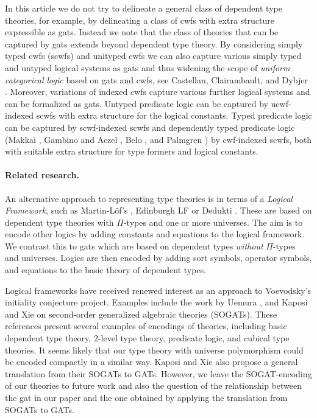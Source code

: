 \documentclass{easychair}
\def\Sigmaext{{\Sigma^\mathrm{ext}}}
\def\Sigmaint{{\Sigma^\mathrm{up}}}
\def\TText{{\mathbf{TT}^\mathrm{ext}}}
\def\TTint{{\mathbf{TT}^\mathrm{up}}}
\begin{document}
In this article we do not try to delineate a general class of dependent type theories, for example, by delineating a class of cwfs with extra structure expressible as gats. Instead we note that the class of theories that can be captured by gats extends beyond dependent type theory. By considering simply typed cwfs (scwfs) and unityped cwfs we can also capture various simply typed and untyped logical systems as gats and thus widening the scope of {\em uniform categorical logic} based on gats and cwfs, see Castellan, Clairambault, and Dybjer \cite{castellan:lambek}.
Moreover, variations of indexed cwfs capture various further logical systems and can be formalized as gats. Untyped predicate logic can be captured by ucwf-indexed scwfs with extra structure for the logical constants. Typed predicate logic can be captured by scwf-indexed scwfs and dependently typed predicate logic (Makkai \cite{makkai:folds}, Gambino and Aczel \cite{gambino-aczel}, Belo \cite{belo}, and Palmgren \cite{Palmgren19}) by cwf-indexed scwfs, both with suitable extra structure for type formers and logical constants.

\paragraph{Related research.}
An alternative approach to representing type theories is in terms of a {\em Logical Framework}, such as Martin-Löf's
\cite{nordstrom:book}, Edinburgh LF \cite{harper-honsell-plotkin} or Dedukti \cite{dowek-dedukti}. These are based on dependent type theories with $\Pi$-types and one or more universes. The aim is to encode other logics by adding constants and equations to the logical framework. We contrast this to gats which are based on dependent types {\em without} $\Pi$-types and universes. Logics are then encoded by adding sort symbols, operator symbols, and equations to the basic theory of dependent types.

Logical frameworks have received renewed interest as an approach to Voevodsky's initiality conjecture project. Examples include the work by %
Uemura \cite{Uemura23}, and Kaposi and Xie \cite{kaposi:sogat} on second-order generalized algebraic theories (SOGATs). These references present several examples of encodings of theories, including basic dependent type theory, 2-level type theory, predicate logic, and cubical type theories. It seems likely that our type theory with universe polymorphism could be encoded compactly in a similar way. Kaposi and Xie also propose a general translation from their SOGATs to GATs. However, we leave the SOGAT-encoding of our theories to future work and also the question of the relationship between the gat in our paper and the one obtained by applying the translation from SOGATs to GATs.
\end{document}
